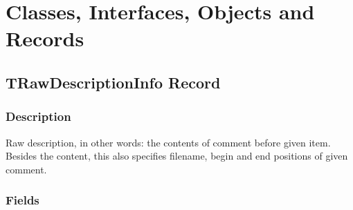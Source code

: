 \documentclass{report}
\newif\ifpdf
\begin{document}
\section{Classes, Interfaces, Objects and Records}
\ifpdf
\subsection*{\large{\textbf{TRawDescriptionInfo Record}}\normalsize\hspace{1ex}\hrulefill}
\else
\subsection*{TRawDescriptionInfo Record}
\fi
\label{PasDoc_Items.TRawDescriptionInfo}
\subsubsection*{\large{\textbf{Description}}\normalsize\hspace{1ex}\hfill}
Raw description, in other words: the contents of comment before given item. Besides the content, this also specifies filename, begin and end positions of given comment.\subsubsection*{\large{\textbf{Fields}}\normalsize\hspace{1ex}\hfill}
\end{document}
